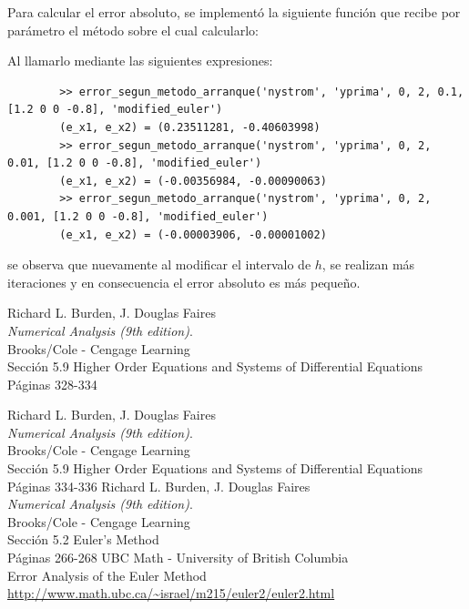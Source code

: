 \documentclass[titlepage,a4paper]{article}
\begin{document}
	Para calcular el error absoluto, se implementó la siguiente función que recibe por parámetro el método sobre el cual calcularlo:
	

	Al llamarlo mediante las siguientes expresiones:

	\begin{lstlisting}
		>> error_segun_metodo_arranque('nystrom', 'yprima', 0, 2, 0.1, [1.2 0 0 -0.8], 'modified_euler')
		(e_x1, e_x2) = (0.23511281, -0.40603998)
		>> error_segun_metodo_arranque('nystrom', 'yprima', 0, 2, 0.01, [1.2 0 0 -0.8], 'modified_euler')
		(e_x1, e_x2) = (-0.00356984, -0.00090063)
		>> error_segun_metodo_arranque('nystrom', 'yprima', 0, 2, 0.001, [1.2 0 0 -0.8], 'modified_euler')
		(e_x1, e_x2) = (-0.00003906, -0.00001002)
	\end{lstlisting}

	se observa que nuevamente al modificar el intervalo de $ h $, se realizan más iteraciones y en consecuencia el error absoluto es más pequeño.


\begin{thebibliography}{9} 
		Richard L. Burden, J. Douglas Faires\\
		\textit{Numerical Analysis (9th edition)}. \\
		Brooks/Cole - Cengage Learning\\
		Sección 5.9 Higher Order Equations and Systems of Differential Equations\\
		Páginas 328-334

		Richard L. Burden, J. Douglas Faires\\
		\textit{Numerical Analysis (9th edition)}.\\ 
		Brooks/Cole - Cengage Learning\\
		Sección 5.9 Higher Order Equations and Systems of Differential Equations\\
		Páginas 334-336
		Richard L. Burden, J. Douglas Faires\\
		\textit{Numerical Analysis (9th edition)}. \\
		Brooks/Cole - Cengage Learning\\
		Sección 5.2 Euler's Method\\
		Páginas 266-268
		UBC Math - University of British Columbia\\
		Error Analysis of the Euler Method\\
		\url{http://www.math.ubc.ca/~israel/m215/euler2/euler2.html}
	 
\end{thebibliography}
\end{document}
